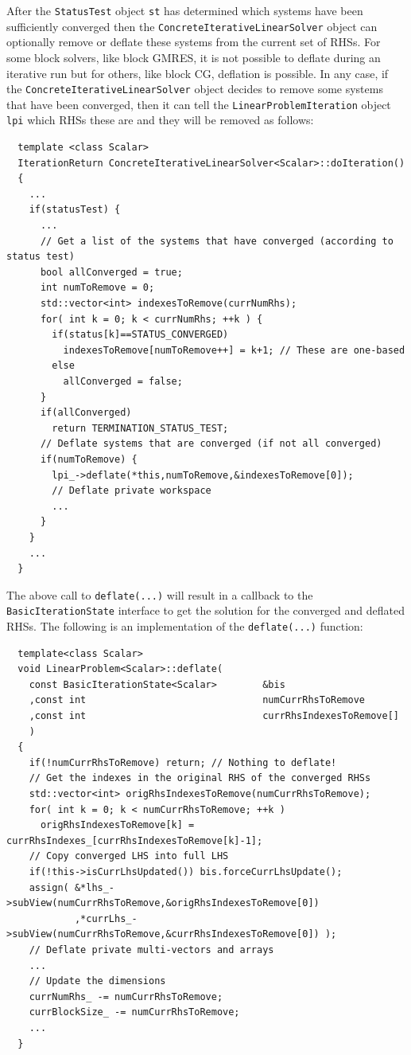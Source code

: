 \documentclass[pdf,ps2pdf,11pt]{SANDreport}
\begin{document}
\begin{enumerate}
After the {}\texttt{Status\-Test} object {}\texttt{st} has determined
which systems have been sufficiently converged then the
{}\texttt{Concrete\-Iterative\-Linear\-Solver} object can optionally remove
or deflate these systems from the current set of RHSs.  For some block
solvers, like block GMRES, it is not possible to deflate during an
iterative run but for others, like block CG, deflation is possible.
In any case, if the {}\texttt{Concrete\-Iterative\-Linear\-Solver} object
decides to remove some systems that have been converged, then it can
tell the {}\texttt{Linear\-Problem\-Iteration} object {}\texttt{lpi}
which RHSs these are and they will be removed as follows:

{\scriptsize\begin{verbatim}
  template <class Scalar>
  IterationReturn ConcreteIterativeLinearSolver<Scalar>::doIteration()
  {
    ...
    if(statusTest) {
      ...
      // Get a list of the systems that have converged (according to status test)
      bool allConverged = true;
      int numToRemove = 0;
      std::vector<int> indexesToRemove(currNumRhs);
      for( int k = 0; k < currNumRhs; ++k ) {
        if(status[k]==STATUS_CONVERGED)
          indexesToRemove[numToRemove++] = k+1; // These are one-based
        else
          allConverged = false;
      }
      if(allConverged)
        return TERMINATION_STATUS_TEST;
      // Deflate systems that are converged (if not all converged)
      if(numToRemove) {
        lpi_->deflate(*this,numToRemove,&indexesToRemove[0]);
        // Deflate private workspace
        ...
      }
    }
    ...
  }
\end{verbatim}}

The above call to {}\texttt{deflate(...)} will result in a callback to
the {}\texttt{Basic\-Iteration\-State} interface to get the solution
for the converged and deflated RHSs.  The following is an
implementation of the {}\texttt{deflate(...)} function:

{\scriptsize\begin{verbatim}
  template<class Scalar>
  void LinearProblem<Scalar>::deflate(
    const BasicIterationState<Scalar>        &bis
    ,const int                               numCurrRhsToRemove
    ,const int                               currRhsIndexesToRemove[]
    )
  {
    if(!numCurrRhsToRemove) return; // Nothing to deflate!
    // Get the indexes in the original RHS of the converged RHSs
    std::vector<int> origRhsIndexesToRemove(numCurrRhsToRemove);
    for( int k = 0; k < numCurrRhsToRemove; ++k )
      origRhsIndexesToRemove[k] = currRhsIndexes_[currRhsIndexesToRemove[k]-1];
    // Copy converged LHS into full LHS
    if(!this->isCurrLhsUpdated()) bis.forceCurrLhsUpdate();
    assign( &*lhs_->subView(numCurrRhsToRemove,&origRhsIndexesToRemove[0])
            ,*currLhs_->subView(numCurrRhsToRemove,&currRhsIndexesToRemove[0]) );
    // Deflate private multi-vectors and arrays
    ...
    // Update the dimensions
    currNumRhs_ -= numCurrRhsToRemove;
    currBlockSize_ -= numCurrRhsToRemove;
    ...
  }
\end{verbatim}}


\end{enumerate}
\end{document}

